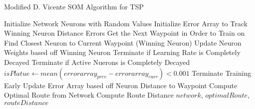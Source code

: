 \documentclass{article}
\begin{document}
\begin{algorithm}
    \caption{Modified D. Vicente SOM Algorithm for TSP}
    \begin{algorithmic}
        \Statex
        \State Initialize Network Neurons with Random Values
        \State Initialize Error Array to Track Winning Neuron Distance Errors
        \Statex
                \State Get the Next Waypoint in Order to Train on
                \State Find Closest Neuron to Current Waypoint (Winning Neuron)
                \State Update Neuron Weights based off Winning Neuron
	     \State Terminate if Learning Rate is Completely Decayed
                \State Terminate if Active Nuerons is Completely Decayed
	     \State $isPlatue \gets mean(errorarray_{prev} -  errorarray_{curr}) < 0.001$
		\State Terminate Training Early
	     \EndIf
                \State Update Error Array based off Neuron Distance to Waypoint
            \EndFor
            \State Compute Optimal Route from Network
            \State Compute Route Distance
            \State \Return $network$, $optimalRoute$, $routeDistance$
        \Statex
    \end{algorithmic}
\end{algorithm}
\end{document}
